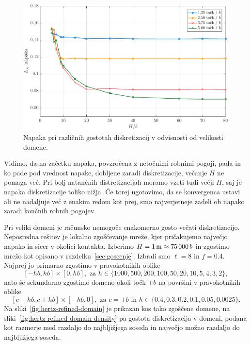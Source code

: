 \documentclass[12pt,a4paper,twoside]{article}
\theoremstyle{definition} %
\theoremstyle{plain} %
\numberwithin{equation}{section}
\newlength{\iw}
\begin{document}
\begin{figure}[!h]
  \centering
  \includegraphics[width=\iw]{images/hertzian_domain_too_small2.pdf}
  \caption[Napaka v odvisnosti od velikosti domene.]{Napaka pri različnih
  gostotah diskretizacij v odvisnosti od velikosti domene.}
  \label{fig:hertz-domain-too-small}
\end{figure}

Vidimo, da na začetku napaka, povzročena z netočnimi robnimi pogoji, pada in ko pade pod vrednost
napake, dobljene zaradi diskretizacije, večanje $H$ ne pomaga več. Pri bolj natančnih
distretizacijah moramo vzeti tudi večji $H$, saj je napaka diskretizacije toliko nižja.
Če torej ugotovimo, da se konvergenca ustavi ali ne nadaljuje več z enakim redom kot prej,
smo najverjetneje zadeli ob napako zaradi končnih robnih pogojev.

Pri veliki domeni je računsko nemogoče enakomerno gosto večati diskretizacijo. Neposredna rešitev je
lokalno zgoščevanje mreže, kjer pričakujemo največjo napako in sicer v okolici kontakta.  Izberimo
$H = \unit[1]{m} \approx 75\,000\, b$ in zgostimo mrežo kot opisano v razdelku~\ref{sec:goscenje}.
Izbrali smo $\ell = 8$ in $f = 0.4$.
Najprej jo primarno zgostimo v pravokotnikih oblike \[
  [-hb, hb] \times [0, hb], \text{ za } h \in \{1000, 500, 200, 100, 50, 20, 10, 5, 4, 3, 2\},
\] nato še sekundarno zgostimo domeno okoli točk $\pm b$ na površini v pravokotnikih oblike \[
  [c-hb, c+hb] \times [-hb, 0], \text{ za } c = \pm b \text{ in } h \in \{0.4, 0.3, 0.2, 0.1, 0.05, 0.0025\}.
\]
Na sliki~\ref{fig:hertz-refined-domain} je prikazan kos tako zgoščene domene, na
sliki~\ref{fig:hertz-refined-domain-density} pa gostota diskretizacija v domeni, podana kot razmerje
med razdaljo do najbljižjega soseda in največjo možno razdaljo do najbljižjega soseda.
\end{document}
